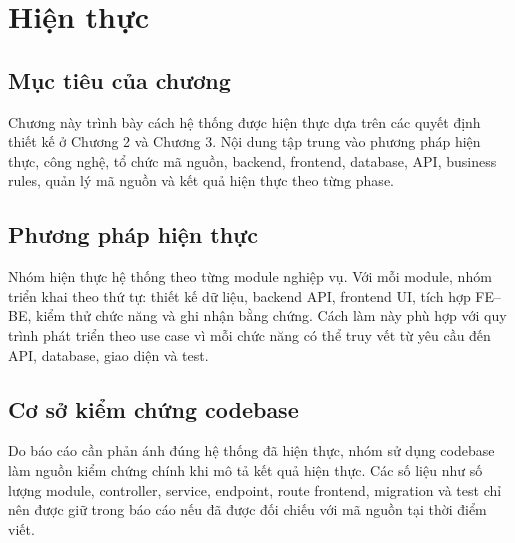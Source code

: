 \chapter{Hiện thực}

\section{Mục tiêu của chương}

Chương này trình bày cách hệ thống được hiện thực dựa trên các quyết định thiết kế ở Chương 2 và Chương 3. Nội dung tập trung vào phương pháp hiện thực, công nghệ, tổ chức mã nguồn, backend, frontend, database, API, business rules, quản lý mã nguồn và kết quả hiện thực theo từng phase.

\section{Phương pháp hiện thực}

Nhóm hiện thực hệ thống theo từng module nghiệp vụ. Với mỗi module, nhóm triển khai theo thứ tự: thiết kế dữ liệu, backend API, frontend UI, tích hợp FE--BE, kiểm thử chức năng và ghi nhận bằng chứng. Cách làm này phù hợp với quy trình phát triển theo use case vì mỗi chức năng có thể truy vết từ yêu cầu đến API, database, giao diện và test.

\section{Cơ sở kiểm chứng codebase}

Do báo cáo cần phản ánh đúng hệ thống đã hiện thực, nhóm sử dụng codebase làm nguồn kiểm chứng chính khi mô tả kết quả hiện thực. Các số liệu như số lượng module, controller, service, endpoint, route frontend, migration và test chỉ nên được giữ trong báo cáo nếu đã được đối chiếu với mã nguồn tại thời điểm viết.

